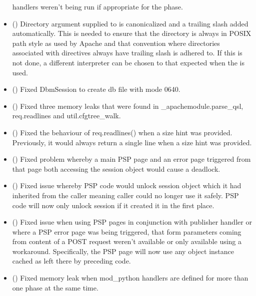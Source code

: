 \begin{itemize}
      handlers weren't being run if appropriate for the phase.
    \item
      ()
      Directory argument supplied to  is
      canonicalized and a trailing slash added automatically. This is
      needed to ensure that the directory is always in POSIX path style as
      used by Apache and that convention where directories associated with
      directives always have trailing slash is adhered to. If this is not
      done, a different interpreter can be chosen to that expected when the
       is used.
    \item
      ()
      Fixed DbmSession to create db file with mode 0640.
    \item
      ()
      Fixed three memory leaks that were found in _apachemodule.parse_qsl, req.readlines
      and util.cfgtree_walk.
    \item
      ()
      Fixed the behaviour of req.readlines() when a size hint was provided. Previously,
      it would always return a single line when a size hint was provided.
    \item
      ()
      Fixed problem whereby a main PSP page and an error page triggered from
      that page both accessing the session object would cause a deadlock.
    \item
      ()
      Fixed issue whereby PSP code would unlock session object which it had
      inherited from the caller meaning caller could no longer use it safely.
      PSP code will now only unlock session if it created it in the first
      place.
    \item
      ()
      Fixed issue when using PSP pages in conjunction with publisher handler
      or where a PSP error page was being triggered, that form parameters
      coming from content of a POST request weren't available or only available
      using a workaround. Specifically, the PSP page will now use any
       object instance cached as  left
      there by preceding code.
    \item
      ()
      Fixed memory leak when mod_python handlers are defined for more than
      one phase at the same time.
  \end{itemize}


